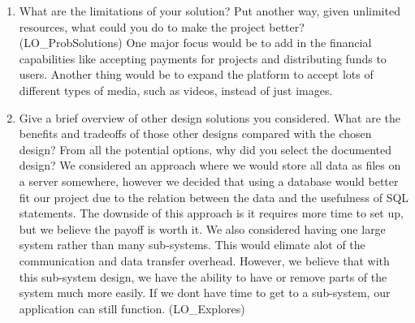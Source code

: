 \documentclass[12pt, titlepage]{article}
\begin{document}
\begin{enumerate}
  \item What are the limitations of your solution?  Put another way, given
  unlimited resources, what could you do to make the project better? (LO\_ProbSolutions)
  One major focus would be to add in the financial capabilities like accepting payments for projects and distributing funds to users. Another thing would be to expand the platform to accept lots of different types of media, such as videos, instead of just images.
  \item Give a brief overview of other design solutions you considered.  What
  are the benefits and tradeoffs of those other designs compared with the chosen
  design?  From all the potential options, why did you select the documented design?
  We considered an approach where we would store all data as files on a server somewhere, however we decided that using a database would better fit our project due to the relation between the data and the usefulness of SQL statements. The downside of this approach is it requires more time to set up, but we believe the payoff is worth it.
  We also considered having one large system rather than many sub-systems. This would elimate alot of the communication and data transfer overhead. However, we believe that with this sub-system design, we have the ability to have or remove parts of the system much more easily. If we dont have time to get to a sub-system, our application can still function.
  (LO\_Explores)
\end{enumerate}
\end{document}
